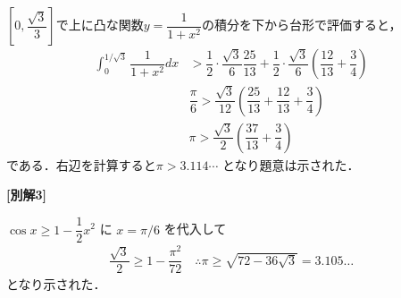 \documentclass[../../main.tex]{subfiles}
\begin{document}
$[0,\dfrac{\sqrt{3}}{3}]$で上に凸な関数$y=\dfrac{1}{1+x^2}$の積分を下から台形で評価すると，
\begin{align}
  \int_0^{1/\sqrt{3}} \dfrac{1}{1+x^2} dx
  &> \dfrac{1}{2} \cdot \dfrac{\sqrt{3}}{6} \dfrac{25}{13} + \dfrac{1}{2} \cdot \dfrac{\sqrt{3}}{6} \left( \dfrac{12}{13} + \dfrac{3}{4} \right) \\
  & \dfrac{\pi}{6} > \dfrac{\sqrt{3}}{12} \left( \dfrac{25}{13} + \dfrac{12}{13} + \dfrac{3}{4} \right) \\
  & \pi > \dfrac{\sqrt{3}}{2} \left( \dfrac{37}{13} + \dfrac{3}{4} \right)
\end{align}
である．右辺を計算すると$\pi > 3.114\cdots$ となり題意は示された．

{\bf [別解3]}

$\cos x \ge 1 - \dfrac{1}{2}x^2$ に $x = \pi/6$ を代入して
\begin{align}
  \dfrac{\sqrt{3}}{2} \ge 1 - \dfrac{\pi^2}{72} \quad \therefore \pi \ge \sqrt{72-36\sqrt{3}} = 3.105\dots
\end{align}
となり示された．
\end{document}
